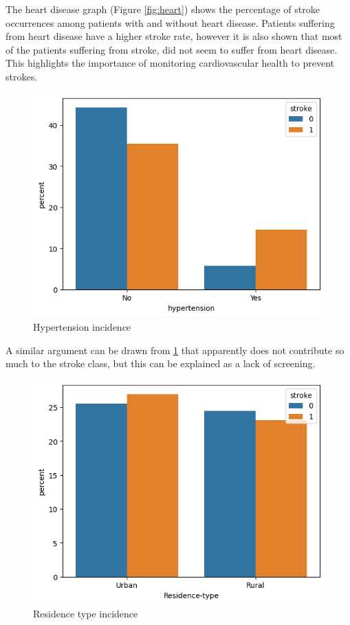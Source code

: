 \documentclass[twocolumn, 9pt]{extarticle}
\begin{document}
The heart disease graph (Figure \ref{fig:heart}) shows the percentage of stroke occurrences among patients with and without heart disease. Patients suffering from heart disease have a higher stroke rate, however it is also shown that most of the patients suffering from stroke, did not seem to suffer from heart disease. This highlights the importance of monitoring cardiovascular health to prevent strokes.

\begin{figure}[h]
\centering
\includegraphics[scale=0.4]{images/hypertension_graph.png}
\caption{Hypertension incidence}
\label{fig:hypertension}
\end{figure}

A similar argument can be drawn from \ref{fig:hypertension} that apparently does not contribute so much to the stroke class, but this can be explained as a lack of screening.

\begin{figure}[h]
\centering
\includegraphics[scale=0.4]{images/residence_type_graph.png}
\caption{Residence type incidence}
\label{fig:residence}
\end{figure}
\end{document}
